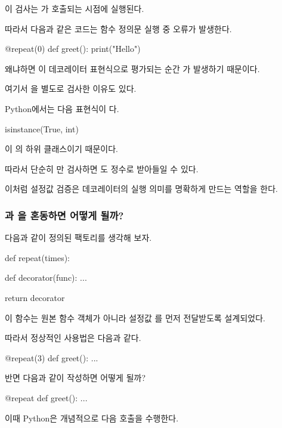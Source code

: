 이 검사는 가 호출되는 시점에 실행된다.

따라서 다음과 같은 코드는 함수 정의문 실행 중 오류가 발생한다.

\begin{dhkcode}
@repeat(0)
def greet():
    print("Hello")
\end{dhkcode}

왜냐하면 이 데코레이터 표현식으로 평가되는 순간 가 발생하기 때문이다.

여기서 을 별도로 검사한 이유도 있다.

Python에서는 다음 표현식이 다.

\begin{dhkcode}
isinstance(True, int)
\end{dhkcode}

이 의 하위 클래스이기 때문이다.

따라서 단순히 만 검사하면 도 정수로 받아들일 수 있다.

이처럼 설정값 검증은 데코레이터의 실행 의미를 명확하게 만드는 역할을 한다.

\subsubsection{과 을 혼동하면 어떻게 될까?}

다음과 같이 정의된 팩토리를 생각해 보자.

\begin{dhkcode}
def repeat(times):

    def decorator(func):
        ...

    return decorator
\end{dhkcode}

이 함수는 원본 함수 객체가 아니라 설정값 를 먼저 전달받도록 설계되었다.

따라서 정상적인 사용법은 다음과 같다.

\begin{dhkcode}
@repeat(3)
def greet():
    ...
\end{dhkcode}

반면 다음과 같이 작성하면 어떻게 될까?

\begin{dhkcode}
@repeat
def greet():
    ...
\end{dhkcode}

이때 Python은 개념적으로 다음 호출을 수행한다.


